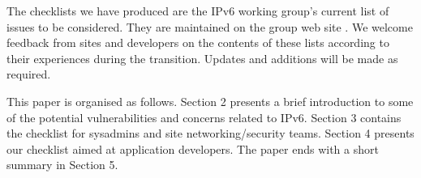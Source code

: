 The checklists we have produced are the IPv6 working group's current list of issues to be considered. They are maintained on the group web site \cite {ipv6wg}. We welcome feedback from sites and developers on the contents of these lists according to their experiences during the transition. Updates and additions will be made as required.

This paper is organised as follows. Section 2 presents a brief introduction to some of the potential vulnerabilities and concerns related to IPv6. Section 3 contains the checklist for sysadmins and site networking/security teams. Section 4 presents our checklist aimed at application developers. The paper ends with a short summary in Section 5.





